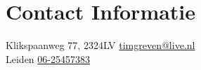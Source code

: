 \section{\sc Contact Informatie}
Klikspaanweg 77, 2324LV      \hfill \href{mailto:timgreven@live.nl}{timgreven@live.nl}\\
Leiden							 \hfill \href{tel:+31625457383}{06-25457383}\\


